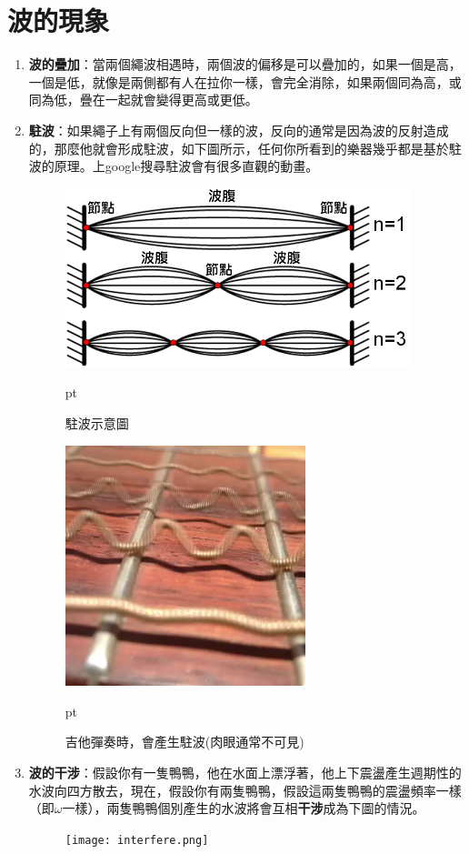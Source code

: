 \section{波的現象}
\begin{enumerate}
\item \textbf{波的疊加}：當兩個繩波相遇時，兩個波的偏移是可以疊加的，如果一個是高，一個是低，就像是兩側都有人在拉你一樣，會完全消除，如果兩個同為高，或同為低，疊在一起就會變得更高或更低。


\item \textbf{駐波}：如果繩子上有兩個反向但一樣的波，反向的通常是因為波的反射造成的，那麼他就會形成駐波，如下圖所示，任何你所看到的樂器幾乎都是基於駐波的原理。上google搜尋駐波會有很多直觀的動畫。

\begin{figure}[H]
\centering
\graphicspath{{physics/}}
\includegraphics[width=10cm, center]{stationary_wave.png}
\caption{駐波示意圖}  pt
\label{fig:stationary_wave1}
\end{figure}

\begin{figure}[H]
\centering
\graphicspath{{physics/}}
\includegraphics[width=7cm, center]{guitar.jpg}
\caption{吉他彈奏時，會產生駐波(肉眼通常不可見)}  pt
\label{fig:guitar}
\end{figure}

\item \textbf{波的干涉}：假設你有一隻鴨鴨，他在水面上漂浮著，他上下震盪產生週期性的水波向四方散去，現在，假設你有兩隻鴨鴨，假設這兩隻鴨鴨的震盪頻率一樣（即$\omega$一樣），兩隻鴨鴨個別產生的水波將會互相\textbf{干涉}成為下圖的情況。
\begin{figure}[H]
\centering
\graphicspath{{physics/}}
\texttt{[image: interfere.png]}
\label{fig:interfere}
\end{figure}
\end{enumerate}


